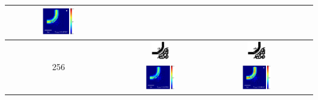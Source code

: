 \begin{table}[ht]
\begin{tabular}{|c|c|c|c|}
      \includegraphics[width=0.33\textwidth]{image/results/bend/PSO/visualize_field_fab_128.png} \\
    \hline
      \multirow{2}{*}{256} &
      \includegraphics[width=0.20\textwidth]{image/results/bend/PSO/visualize_eps_cont_256.png} &
      \includegraphics[width=0.20\textwidth]{image/results/bend/PSO/visualize_eps_disc_256.png} \\
      \cline{2-4}
      &
      \includegraphics[width=0.33\textwidth]{image/results/bend/PSO/visualize_field_cont_256.png} &
      \includegraphics[width=0.33\textwidth]{image/results/bend/PSO/visualize_field_disc_256.png} \\

\end{tabular}
\end{table}
